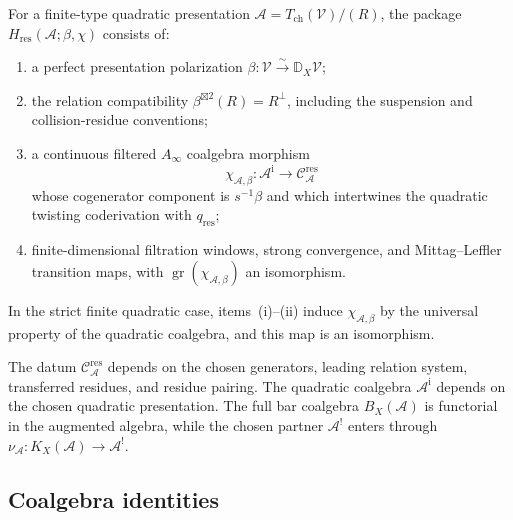 \begin{definition}
\label{def:residue-self-duality-package}
For a finite-type quadratic presentation
$\mathcal A=T_{\mathrm{ch}}(\mathcal V)/(R)$, the package
$H_{\mathrm{res}}(\mathcal A;\beta,\chi)$ consists of:
\begin{enumerate}[label=\textup{(\roman*)}]
\item a perfect presentation polarization
$\beta\colon\mathcal V\xrightarrow{\sim}\mathbb D_X\mathcal V$;
\item the relation compatibility
$\beta^{\boxtimes2}(R)=R^\perp$, including the suspension and
collision-residue conventions;
\item a continuous filtered $A_\infty$ coalgebra morphism
\[
 \chi_{\mathcal A,\beta}\colon
 \mathcal A^{\mathrm i}\longrightarrow
 \mathcal C_{\mathcal A}^{\mathrm{res}}
\]
whose cogenerator component is $s^{-1}\beta$ and which intertwines
the quadratic twisting coderivation with $q_{\mathrm{res}}$;
\item finite-dimensional filtration windows, strong convergence, and
Mittag--Leffler transition maps, with
$\operatorname{gr}(\chi_{\mathcal A,\beta})$ an isomorphism.
\end{enumerate}
In the strict finite quadratic case, items~\textup{(i)}--\textup{(ii)}
induce $\chi_{\mathcal A,\beta}$ by the universal property of the
quadratic coalgebra, and this map is an isomorphism.
\end{definition}

\begin{remark}
\label{rem:independence-construction}
The datum $\mathcal C_{\mathcal A}^{\mathrm{res}}$ depends on the
chosen generators, leading relation system, transferred residues, and
residue pairing.  The quadratic coalgebra $\mathcal A^{\mathrm i}$
depends on the chosen quadratic presentation.  The full bar coalgebra
$B_X(\mathcal A)$ is functorial in the augmented algebra, while the
chosen partner $\mathcal A^!$ enters through
$\nu_{\mathcal A}\colon K_X(\mathcal A)\to\mathcal A^!$.
\end{remark}


\subsection{Coalgebra identities}

